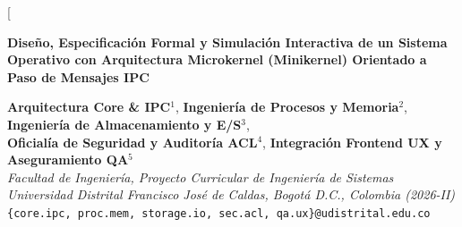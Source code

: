 \documentclass[10pt,twocolumn,letterpaper]{article}
\begin{document}
\twocolumn[
\begin{@twocolumnfalse}
\begin{center}
  {\LARGE\bfseries Dise\~no, Especificaci\'on Formal y Simulaci\'on Interactiva de un Sistema Operativo con Arquitectura Microkernel (Minikernel) Orientado a Paso de Mensajes IPC\par}
  \vspace{10pt}
  {\normalsize
    \textbf{Arquitectura Core \& IPC}$^{1}$,
    \textbf{Ingenier\'ia de Procesos y Memoria}$^{2}$,
    \textbf{Ingenier\'ia de Almacenamiento y E/S}$^{3}$,\\
    \textbf{Oficial\'ia de Seguridad y Auditor\'ia ACL}$^{4}$,
    \textbf{Integraci\'on Frontend UX y Aseguramiento QA}$^{5}$\\[4pt]
    \textit{Facultad de Ingenier\'ia, Proyecto Curricular de Ingenier\'ia de Sistemas}\\
    \textit{Universidad Distrital Francisco Jos\'e de Caldas, Bogot\'a D.C., Colombia (2026-II)}\\
    \texttt{\{core.ipc, proc.mem, storage.io, sec.acl, qa.ux\}@udistrital.edu.co}
  }
\end{center}
\vspace{6pt}


\end{@twocolumnfalse}
\end{document}
